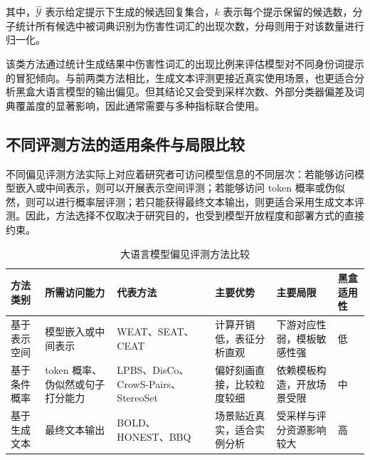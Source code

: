 其中，$\hat{\mathcal{Y}}$ 表示给定提示下生成的候选回复集合，$k$ 表示每个提示保留的候选数，分子统计所有候选中被词典识别为伤害性词汇的出现次数，分母则用于对该数量进行归一化。

该类方法通过统计生成结果中伤害性词汇的出现比例来评估模型对不同身份词提示的冒犯倾向。与前两类方法相比，生成文本评测更接近真实使用场景，也更适合分析黑盒大语言模型的输出偏见。但其结论又会受到采样次数、外部分类器偏差及词典覆盖度的显著影响，因此通常需要与多种指标联合使用\cite{DBLP:journals/coling/GallegosRBTKDYZA24}。

\subsection{不同评测方法的适用条件与局限比较}

不同偏见评测方法实际上对应着研究者可访问模型信息的不同层次：若能够访问模型嵌入或中间表示，则可以开展表示空间评测；若能够访问 token 概率或伪似然，则可以进行概率层评测；若只能获得最终文本输出，则更适合采用生成文本评测\cite{DBLP:journals/coling/GallegosRBTKDYZA24}。因此，方法选择不仅取决于研究目的，也受到模型开放程度和部署方式的直接约束。

\begin{table}[hbt]
    \centering
    \caption{大语言模型偏见评测方法比较}
    \label{tab:bias-eval-compare}
    \small
    \renewcommand{\tabularxcolumn}[1]{m{#1}}
    \begin{tabularx}{\textwidth}{>{\centering\arraybackslash}m{1.8cm}>{\centering\arraybackslash}m{2.2cm}>{\centering\arraybackslash}m{3.0cm}>{\centering\arraybackslash}X>{\centering\arraybackslash}X>{\centering\arraybackslash}m{1.4cm}}
        \toprule
        方法类别 & 所需访问能力 & 代表方法 & 主要优势 & 主要局限 & 黑盒适用性 \\
        \midrule
        基于表示空间 & 模型嵌入或中间表示 & WEAT\cite{caliskan2017semantics}、SEAT\cite{DBLP:conf/naacl/MayWBBR19}、CEAT\cite{DBLP:conf/aies/GuoC21} & 计算开销低，表征分析直观 & 下游对应性弱，模板敏感性强 & 低 \\
        基于条件概率 & token 概率、伪似然或句子打分能力 & LPBS\cite{DBLP:journals/corr/abs-1906-07337}、DisCo\cite{DBLP:journals/corr/abs-2010-06032}、CrowS-Pairs\cite{DBLP:conf/emnlp/NangiaVBB20}、StereoSet\cite{DBLP:conf/acl/NadeemBR20} & 偏好刻画直接，比较粒度较细 & 依赖模板构造，开放场景受限 & 中 \\
        基于生成文本 & 最终文本输出 & BOLD\cite{DBLP:conf/fat/DhamalaSKKPCG21}、HONEST\cite{DBLP:conf/naacl/NozzaBH21}、BBQ\cite{DBLP:conf/acl/ParrishCNPPTHB22} & 场景贴近真实，适合实例分析 & 受采样与评分资源影响较大 & 高 \\
        \bottomrule
    \end{tabularx}
\end{table}

